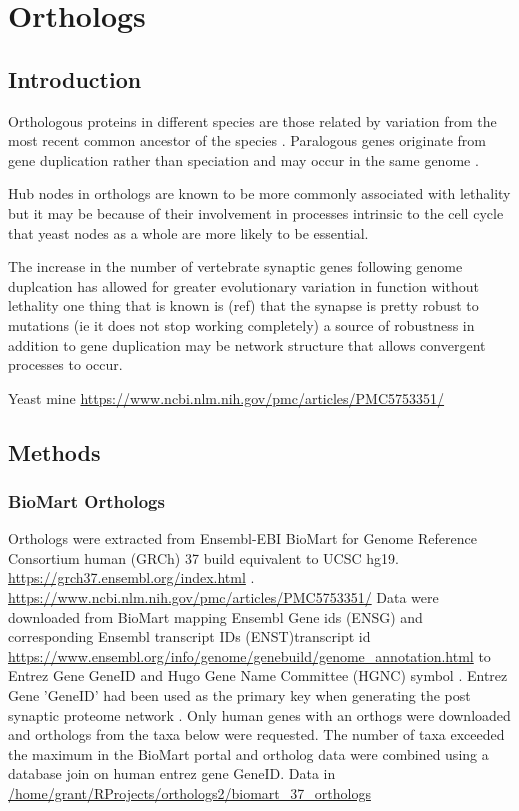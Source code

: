 \chapter{Orthologs}
\section{Introduction}
Orthologous proteins in different species are those related by variation from the most recent common ancestor of the species \cite{fitch2000homology}. Paralogous genes originate from gene duplication rather than speciation and may occur in the same genome \cite{jensen2001orthologs}.

Hub nodes in orthologs are known to be more commonly associated with lethality  but it may be because of their involvement in processes intrinsic to the cell cycle that yeast nodes as a whole are more likely to be essential. 

The increase in the number of vertebrate synaptic genes following genome duplcation has allowed for greater evolutionary variation in function without lethality one thing that is known is (ref) that the synapse is pretty robust to mutations (ie it does not stop working completely) a source of robustness in addition to gene duplication may be network structure that allows convergent processes to occur. 
 
 Yeast mine \url{https://www.ncbi.nlm.nih.gov/pmc/articles/PMC5753351/}
 
\section{Methods}
\subsection{BioMart Orthologs}
Orthologs were extracted from Ensembl-EBI BioMart\cite{kinsella2011ensembl} for Genome Reference Consortium human (GRCh) 37 build equivalent to UCSC hg19. \url{https://grch37.ensembl.org/index.html}  \cite{ramos2011validated}.
\url{https://www.ncbi.nlm.nih.gov/pmc/articles/PMC5753351/}
Data were downloaded from BioMart mapping Ensembl Gene ids (ENSG) and corresponding Ensembl transcript IDs (ENST)transcript id \url{https://www.ensembl.org/info/genome/genebuild/genome_annotation.html} to Entrez Gene GeneID \cite{maglott2005entrez} and Hugo Gene Name Committee (HGNC) symbol \cite{gray2012genenames}. Entrez Gene 'GeneID' had been used as the primary key when generating the post synaptic proteome network . Only human genes with an orthogs were downloaded and orthologs from the taxa below were requested. The number of taxa exceeded the maximum in the BioMart portal and ortholog data were combined using a database join on human entrez gene GeneID. Data in \url{/home/grant/RProjects/orthologs2/biomart_37_orthologs}




